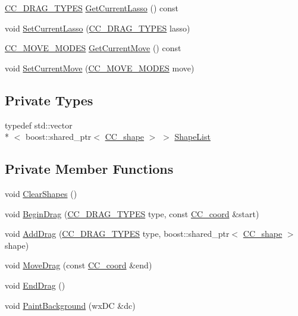 \begin{DoxyCompactItemize}
\hyperlink{a00216_a0fc7c44466a98380192d425c98f22aa6}{C\-C\-\_\-\-D\-R\-A\-G\-\_\-\-T\-Y\-P\-E\-S} \hyperlink{a00101_a76e44f20d8f47ab0fbfeae5cb383b7e4}{Get\-Current\-Lasso} () const 
\item 
void \hyperlink{a00101_a0f57b3715f60267be91d9bdcbdeba506}{Set\-Current\-Lasso} (\hyperlink{a00216_a0fc7c44466a98380192d425c98f22aa6}{C\-C\-\_\-\-D\-R\-A\-G\-\_\-\-T\-Y\-P\-E\-S} lasso)
\item 
\hyperlink{a00216_a45558d38ac05e98ebdbffa5756372654}{C\-C\-\_\-\-M\-O\-V\-E\-\_\-\-M\-O\-D\-E\-S} \hyperlink{a00101_a41d4e10ac454255f77abb527c3359f98}{Get\-Current\-Move} () const 
\item 
void \hyperlink{a00101_abc66ecb8018ed140d6a0dbfcdbab8665}{Set\-Current\-Move} (\hyperlink{a00216_a45558d38ac05e98ebdbffa5756372654}{C\-C\-\_\-\-M\-O\-V\-E\-\_\-\-M\-O\-D\-E\-S} move)
\end{DoxyCompactItemize}
\subsection*{Private Types}
\begin{DoxyCompactItemize}
\item 
typedef std\-::vector\\*
$<$ boost\-::shared\-\_\-ptr$<$ \hyperlink{a00037}{C\-C\-\_\-shape} $>$ $>$ \hyperlink{a00101_a6a92f4fe3444b93e6556b35da0a7e964}{Shape\-List}
\end{DoxyCompactItemize}
\subsection*{Private Member Functions}
\begin{DoxyCompactItemize}
\item 
void \hyperlink{a00101_a46e1b675322a2c7bfe63d2bb10a24be3}{Clear\-Shapes} ()
\item 
void \hyperlink{a00101_acdbaed7fc119f15cad54ae15a7ba2481}{Begin\-Drag} (\hyperlink{a00216_a0fc7c44466a98380192d425c98f22aa6}{C\-C\-\_\-\-D\-R\-A\-G\-\_\-\-T\-Y\-P\-E\-S} type, const \hyperlink{a00029}{C\-C\-\_\-coord} \&start)
\item 
void \hyperlink{a00101_aa14015cdeef3157716369387b4b44bc3}{Add\-Drag} (\hyperlink{a00216_a0fc7c44466a98380192d425c98f22aa6}{C\-C\-\_\-\-D\-R\-A\-G\-\_\-\-T\-Y\-P\-E\-S} type, boost\-::shared\-\_\-ptr$<$ \hyperlink{a00037}{C\-C\-\_\-shape} $>$ shape)
\item 
void \hyperlink{a00101_a47f1da366d33edd35221d8a8193b7ebb}{Move\-Drag} (const \hyperlink{a00029}{C\-C\-\_\-coord} \&end)
\item 
void \hyperlink{a00101_ac975970f76122e2086bab22adb2c6c66}{End\-Drag} ()
\item 
void \hyperlink{a00101_ad2ac0147c978c4e0cc06b8778dfef6fa}{Paint\-Background} (wx\-D\-C \&dc)
\end{DoxyCompactItemize}
